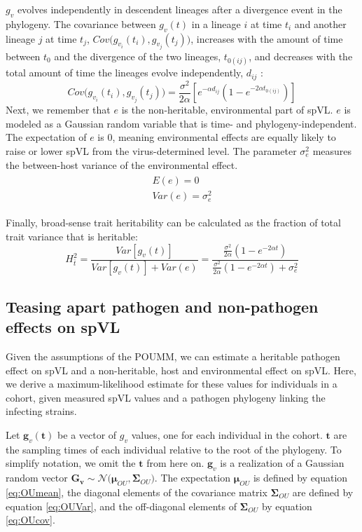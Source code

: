 \documentclass[]{article}
\begin{document}
\begin{doublespace}
$g_v$ evolves independently in descendent lineages after a divergence event in the phylogeny. The covariance between $g_v(t)$ in a lineage $i$ at time $t_i$ and another lineage $j$ at time $t_j$, $Cov\big(g_{v_i}(t_i), g_{v_j}(t_j)\big)$, increases with the amount of time between $t_0$ and the divergence of the two lineages, $t_{0(ij)}$, and decreases with the total amount of time the lineages evolve independently, $d_{ij}$ \citep{Butler2004}: 
\begin{equation}
	Cov\big(g_{v_i}(t_i), g_{v_j}(t_j)\big) = \frac{\sigma^2}{2\alpha}[e^{-\alpha d_{ij}}(1 - e^{-2\alpha t_{0(ij)}})]
	\label{eq:OUcov}
\end{equation}
Next, we remember that $e$ is the non-heritable, environmental part of spVL. $e$ is modeled as a Gaussian random variable that is time- and phylogeny-independent. The expectation of $e$ is 0, meaning environmental effects are equally likely to raise or lower spVL from the virus-determined level. The parameter $\sigma_e^2$ measures the between-host variance of the environmental effect.
\begin{align}
\begin{split}
	E(e) = 0 \\
	Var(e) = \sigma^2_e
\end{split}
\end{align}

Finally, broad-sense trait heritability can be calculated as the fraction of total trait variance that is heritable:
\begin{equation}
	H^2_{\bar{t}} = \frac{Var[g_v(t)]}{Var[g_v(t)] + Var(e)} = \frac{\frac{\sigma^2}{2\alpha}(1 - e^{-2\alpha t})}{\frac{\sigma^2}{2\alpha}(1 - e^{-2\alpha t}) + \sigma^2_e}
\end{equation}

\subsection{Teasing apart pathogen and non-pathogen effects on spVL}

Given the assumptions of the POUMM, we can estimate a heritable pathogen effect on spVL and a non-heritable, host and environmental effect on spVL. Here, we derive a maximum-likelihood estimate for these values for individuals in a cohort, given measured spVL values and a pathogen phylogeny linking the infecting strains.

Let $\bm{g}_v(\bm{t})$ be a vector of $g_v$ values, one for each individual in the cohort. $\bm{t}$ are the sampling times of each individual relative to the root of the phylogeny. To simplify notation, we omit the $\bm{t}$ from here on. $\bm{g}_v$ is a realization of a Gaussian random vector $\bm{G_v} \sim \mathcal{N}\big(\bm{\mu}_{OU}, \boldsymbol{\Sigma}_{OU}\big)$. The expectation $\bm{\mu}_{OU}$ is defined by equation \ref{eq:OUmean}, the diagonal elements of the covariance matrix $\boldsymbol{\Sigma}_{OU}$ are defined by equation \ref{eq:OUVar}, and the off-diagonal elements of $\boldsymbol{\Sigma}_{OU}$ by equation \ref{eq:OUcov}. 


\end{doublespace}
\end{document}
